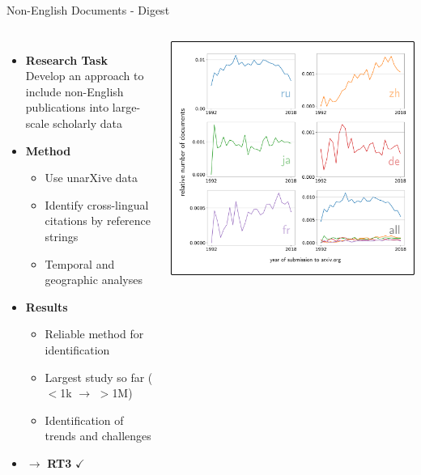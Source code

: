 \documentclass[en,16:9,smallfoot]{sdqbeamer}
\begin{document}
   \begin{frame}{Non-English Documents - Digest}

   \begin{columns}
        \vspace{-1cm}
        \begin{itemize}
            \item \textbf{Research Task}\\Develop an approach to include non-English publications into large-scale scholarly data
            \item \textbf{Method}
            \begin{itemize}
                \item Use unarXive data
                \item Identify cross-lingual citations by reference strings
                \item Temporal and geographic analyses
            \end{itemize}
            \item \textbf{Results}
            \begin{itemize}
                \item Reliable method for identification
                \item Largest study so far ($<$1k $\rightarrow$ $>$1M)
                \item Identification of trends and challenges
            \end{itemize}
            \item $\rightarrow$ \textbf{RT3} $\checkmark$
        \end{itemize}
            \includegraphics[width=0.8\linewidth]{imgs/xling_example_result}

\end{columns}
\end{frame}
\end{document}
